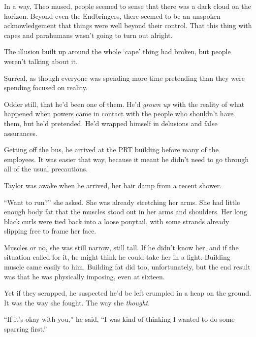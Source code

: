 In a way, Theo mused, people seemed to sense that there was a dark cloud on the horizon.  Beyond even the Endbringers, there seemed to be an unspoken acknowledgement that things were well beyond their control.  That this thing with capes and parahumans wasn't going to turn out alright.



The illusion built up around the whole `cape' thing had broken, but people weren't talking about it.



Surreal, as though everyone was spending more time pretending than they were spending focused on reality.



Odder still, that he'd been one of them.  He'd \emph{grown up} with the reality of what happened when powers came in contact with the people who shouldn't have them, but he'd pretended.  He'd wrapped himself in delusions and false assurances.



Getting off the bus, he arrived at the PRT building before many of the employees.  It was easier that way, because it meant he didn't need to go through all of the usual precautions.



Taylor was awake when he arrived, her hair damp from a recent shower.



``Want to run?'' she asked.  She was already stretching her arms.  She had little enough body fat that the muscles stood out in her arms and shoulders.  Her long black curls were tied back into a loose ponytail, with some strands already slipping free to frame her face.



Muscles or no, she was still narrow, still tall.  If he didn't know her, and if the situation called for it, he might think he could take her in a fight.  Building muscle came easily to him.  Building fat did too, unfortunately, but the end result was that he was physically imposing, even at sixteen.



Yet if they scrapped, he suspected he'd be left crumpled in a heap on the ground.  It was the way she fought.  The way she \emph{thought}.



``If it's okay with you,'' he said, ``I was kind of thinking I wanted to do some sparring first.''



